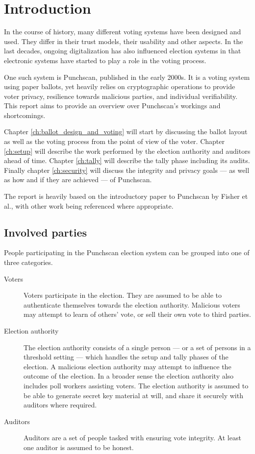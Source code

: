 \chapter{Introduction}
\label{chapter:introduction}

In the course of history, many different voting systems have been designed and
used. They differ in their trust models, their usability and other aspects. In
the last decades, ongoing digitalization has also influenced election systems
in that electronic systems have started to play a role in the voting process.

One such system is Punchscan, published in the early 2000s. It is a voting
system using paper ballots, yet heavily relies on cryptographic operations to
provide voter privacy, resilience towards malicious parties, and individual
verifiability. This report aims to provide an overview over Punchscan's
workings and shortcomings.

Chapter \ref{ch:ballot_design_and_voting} will start by discussing the ballot
layout as well as the voting process from the point of view of the voter.
Chapter \ref{ch:setup} will describe the work performed by the election
authority and auditors ahead of time. Chapter \ref{ch:tally} will describe the
tally phase including its audits. Finally chapter \ref{ch:security} will
discuss the integrity and privacy goals --- as well as how and if they are
achieved --- of Punchscan. 

The report is heavily based on the introductory paper to Punchscan by Fisher et
al.\autocite{fisherPunchscanIntroductionSystem2006}, with other work being
referenced where appropriate.

\section{Involved parties}

People participating in the Punchscan election system can be grouped into one
of three categories.
\begin{description}
\item[Voters] Voters participate in the election. They are assumed to be able
to authenticate themselves towards the election authority. Malicious voters may
attempt to learn of others' vote, or sell their own vote to third parties.
\item[Election authority] The election authority consists of a single person
--- or a set of persons in a threshold setting --- which handles the setup and
tally phases of the election. A malicious election authority may attempt to
influence the outcome of the election. In a broader sense the election
authority also includes poll workers assisting voters. The election authority
is assumed to be able to generate secret key material at will, and share it
securely with auditors where required.
\item[Auditors] Auditors are a set of people tasked with ensuring vote
integrity. At least one auditor is assumed to be honest.
\end{description}


